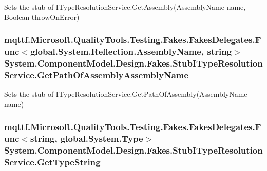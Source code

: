 Sets the stub of I\-Type\-Resolution\-Service.\-Get\-Assembly(\-Assembly\-Name name, Boolean throw\-On\-Error)

\hypertarget{class_system_1_1_component_model_1_1_design_1_1_fakes_1_1_stub_i_type_resolution_service_aa05be80128d41bee988c15c004b6f15f}{
\subsubsection[{Get\-Path\-Of\-Assembly\-Assembly\-Name}]{\setlength{\rightskip}{0pt plus 5cm}mqttf.\-Microsoft.\-Quality\-Tools.\-Testing.\-Fakes.\-Fakes\-Delegates.\-Func$<$global.\-System.\-Reflection.\-Assembly\-Name, string$>$ System.\-Component\-Model.\-Design.\-Fakes.\-Stub\-I\-Type\-Resolution\-Service.\-Get\-Path\-Of\-Assembly\-Assembly\-Name}}\label{class_system_1_1_component_model_1_1_design_1_1_fakes_1_1_stub_i_type_resolution_service_aa05be80128d41bee988c15c004b6f15f}


Sets the stub of I\-Type\-Resolution\-Service.\-Get\-Path\-Of\-Assembly(\-Assembly\-Name name)

\hypertarget{class_system_1_1_component_model_1_1_design_1_1_fakes_1_1_stub_i_type_resolution_service_a9edd248eb73fadf587e60b8327ca68fe}{
\subsubsection[{Get\-Type\-String}]{\setlength{\rightskip}{0pt plus 5cm}mqttf.\-Microsoft.\-Quality\-Tools.\-Testing.\-Fakes.\-Fakes\-Delegates.\-Func$<$string, global.\-System.\-Type$>$ System.\-Component\-Model.\-Design.\-Fakes.\-Stub\-I\-Type\-Resolution\-Service.\-Get\-Type\-String}}\label{class_system_1_1_component_model_1_1_design_1_1_fakes_1_1_stub_i_type_resolution_service_a9edd248eb73fadf587e60b8327ca68fe}


